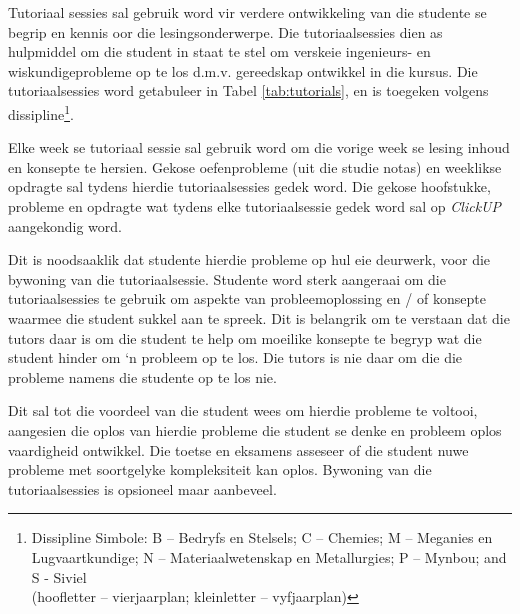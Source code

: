         Tutoriaal sessies sal gebruik word vir verdere ontwikkeling van die
        studente se begrip en kennis oor die lesingsonderwerpe.  Die
        tutoriaalsessies dien as hulpmiddel om die student in staat te stel om
        verskeie ingenieurs- en wiskundigeprobleme op te los d.m.v. gereedskap
        ontwikkel in die kursus. Die tutoriaalsessies word getabuleer in Tabel
        \ref{tab:tutorials}, en is toegeken volgens
        dissipline\footnote{Dissipline Simbole:
            B -- Bedryfs en Stelsels;
            C -- Chemies;
            M -- Meganies en Lugvaartkundige;
            N -- Materiaalwetenskap en Metallurgies;
            P -- Mynbou; and S - Siviel \\
            (hoofletter -- vierjaarplan; kleinletter -- vyfjaarplan)}.

        Elke week se tutoriaal sessie sal gebruik word om die vorige week se
        lesing inhoud en konsepte te hersien. Gekose oefenprobleme (uit die
        studie notas) en weeklikse opdragte sal tydens hierdie tutoriaalsessies
        gedek word. Die gekose hoofstukke, probleme en opdragte wat tydens elke
        tutoriaalsessie gedek word sal op {\it ClickUP} aangekondig word.

        Dit is noodsaaklik dat studente hierdie probleme op hul eie deurwerk,
        voor die bywoning van die tutoriaalsessie. Studente word sterk
        aangeraai om die tutoriaalsessies te gebruik om aspekte van
        probleemoplossing en / of konsepte waarmee die student sukkel aan te
        spreek. Dit is belangrik om te verstaan dat die tutors daar is om die
        student te help om moeilike konsepte te begryp wat die student hinder
        om `n probleem op te los. Die tutors is nie daar om die die probleme
        namens die studente op te los nie.

        Dit sal tot die voordeel van die student wees om hierdie probleme te
        voltooi, aangesien die oplos van hierdie probleme die student se denke
        en probleem oplos vaardigheid ontwikkel.  Die toetse en eksamens
        asseseer of die student nuwe probleme met soortgelyke kompleksiteit kan
        oplos. Bywoning van die tutoriaalsessies is opsioneel maar aanbeveel.

